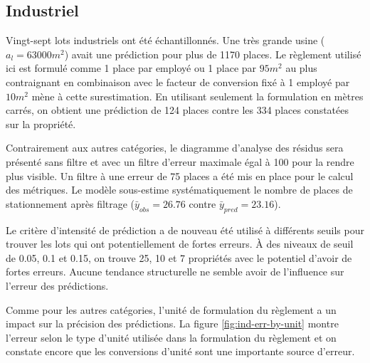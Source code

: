 \subsection{Industriel}
Vingt-sept lots industriels ont été échantillonnés. Une très grande usine ($a_l = 63000m^2$) avait une prédiction pour plus de 1170 places. Le règlement utilisé ici est formulé comme 1 place par employé ou 1 place par $95m^2$ au plus contraignant en combinaison avec le facteur de conversion fixé à 1 employé par $10m^2$ mène à cette surestimation. En utilisant seulement la formulation en mètres carrés, on obtient une prédiction de 124 places contre les 334 places constatées sur la propriété.\par
Contrairement aux autres catégories, le diagramme d'analyse des résidus sera présenté sans filtre et avec un filtre d'erreur maximale égal à 100 pour la rendre plus visible. Un filtre à une erreur de 75 places a été mis en place pour le calcul des métriques. Le modèle sous-estime systématiquement le nombre de places de stationnement après filtrage ($\bar{y}_{obs} = 26.76$ contre $\bar{y}_{pred} = 23.16$). \par
Le critère d'intensité de prédiction a de nouveau été utilisé à différents seuils pour trouver les lots qui ont potentiellement de fortes erreurs. À des niveaux de seuil de 0.05, 0.1 et 0.15, on trouve 25, 10 et 7 propriétés avec le potentiel d'avoir de fortes erreurs. Aucune tendance structurelle ne semble avoir de l'influence sur l'erreur des prédictions.\par
Comme pour les autres catégories, l'unité de formulation du règlement a un impact sur la précision des prédictions. La figure \ref{fig:ind-err-by-unit} montre l'erreur selon le type d'unité utilisée dans la formulation du règlement et on constate encore que les conversions d'unité sont une importante source d'erreur.

